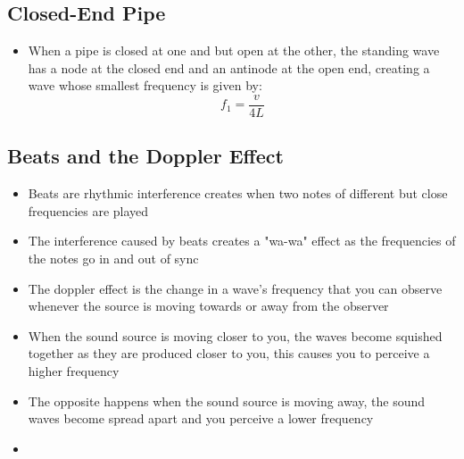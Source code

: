 \subsection{Closed-End Pipe}
\begin{itemize}
    \item When a pipe is closed at one and but open at the other, the standing wave has a node at the closed end and an antinode at the open end, creating a wave whose smallest frequency is given by: \[f_1=\frac{v}{4L}\]
\end{itemize}

\subsection{Beats and the Doppler Effect}
\begin{itemize}
    \item Beats are rhythmic interference creates when two notes of different but close frequencies are played
    \item The interference caused by beats creates a "wa-wa" effect as the frequencies of the notes go in and out of sync
    \item The doppler effect is the change in a wave's frequency that you can observe whenever the source is moving towards or away from the observer
    \item When the sound source is moving closer to you, the waves become squished together as they are produced closer to you, this causes you to perceive a higher frequency
    \item The opposite happens when the sound source is moving away, the sound waves become spread apart and you perceive a lower frequency
    \item 
\end{itemize}
